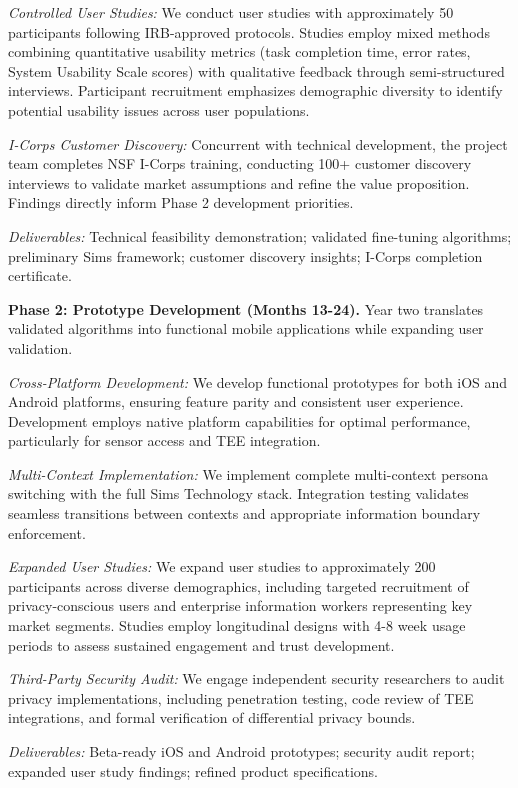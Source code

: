 \documentclass[11pt]{article}
\begin{document}
\textit{Controlled User Studies:} We conduct user studies with approximately 50 participants following IRB-approved protocols. Studies employ mixed methods combining quantitative usability metrics (task completion time, error rates, System Usability Scale scores) with qualitative feedback through semi-structured interviews. Participant recruitment emphasizes demographic diversity to identify potential usability issues across user populations.

\textit{I-Corps Customer Discovery:} Concurrent with technical development, the project team completes NSF I-Corps training, conducting 100+ customer discovery interviews to validate market assumptions and refine the value proposition. Findings directly inform Phase 2 development priorities.

\textit{Deliverables:} Technical feasibility demonstration; validated fine-tuning algorithms; preliminary Sims framework; customer discovery insights; I-Corps completion certificate.

\textbf{Phase 2: Prototype Development (Months 13-24).}
Year two translates validated algorithms into functional mobile applications while expanding user validation.

\textit{Cross-Platform Development:} We develop functional prototypes for both iOS and Android platforms, ensuring feature parity and consistent user experience. Development employs native platform capabilities for optimal performance, particularly for sensor access and TEE integration.

\textit{Multi-Context Implementation:} We implement complete multi-context persona switching with the full Sims Technology stack. Integration testing validates seamless transitions between contexts and appropriate information boundary enforcement.

\textit{Expanded User Studies:} We expand user studies to approximately 200 participants across diverse demographics, including targeted recruitment of privacy-conscious users and enterprise information workers representing key market segments. Studies employ longitudinal designs with 4-8 week usage periods to assess sustained engagement and trust development.

\textit{Third-Party Security Audit:} We engage independent security researchers to audit privacy implementations, including penetration testing, code review of TEE integrations, and formal verification of differential privacy bounds.

\textit{Deliverables:} Beta-ready iOS and Android prototypes; security audit report; expanded user study findings; refined product specifications.
\end{document}
